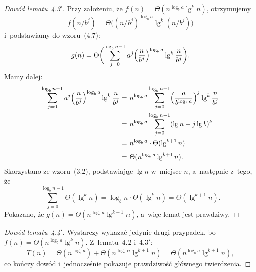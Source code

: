 \begin{proof}[Dowód lematu~4.3\/$'$]
	Przy założeniu, że $f(n)=\Theta(n^{\log_ba}\lg^kn)$, otrzymujemy
	\[
		f(n/b^j)=\Theta\bigl((n/b^j)^{\log_ba}\lg^k(n/b^j)\bigr)
	\]
	i~podstawiamy do wzoru~(4.7):
	\[
		g(n) = \Theta\biggl(\sum_{j=0}^{\log_bn-1}a^j\Bigl(\frac{n}{b^j}\Bigr)^{\log_ba}\lg^k\frac{n}{b^j}\biggr).
	\]
	Mamy dalej:
	\begin{align*}
		\sum_{j=0}^{\log_bn-1}a^j\Bigl(\frac{n}{b^j}\Bigr)^{\log_ba}\lg^k\frac{n}{b^j} &= n^{\log_ba}\sum_{j=0}^{\log_bn-1}\Bigl(\frac{a}{b^{\log_ba}}\Bigr)^j\lg^k\frac{n}{b^j} \\
		&= n^{\log_ba}\sum_{j=0}^{\log_bn-1}(\lg n-j\lg b)^k \\
		&= n^{\log_ba}\cdot\Theta(\lg^{k+1}n) \\[1mm]
		&= \Theta(n^{\log_ba}\lg^{k+1}n).
	\end{align*}
	Skorzystano ze wzoru~(3.2), podstawiając $\lg n$ w~miejsce $n$, a~następnie z~tego, że
	\[
		\sum_{j=0}^{\log_bn-1}\Theta(\lg^kn) = \log_bn\cdot\Theta(\lg^kn) = \Theta(\lg^{k+1}n).
	\]
	Pokazano, że $g(n)=\Theta(n^{\log_ba}\lg^{k+1}n)$, a~więc lemat jest prawdziwy.
\end{proof}

\begin{proof}[Dowód lematu~4.4\/$'$]
	Wystarczy wykazać jedynie drugi przypadek, bo $f(n)=\Theta(n^{\log_ba}\lg^kn)$. Z~lematu~4.2 i~4.3$'$:
	\[
		T(n) = \Theta(n^{\log_ba})+\Theta(n^{\log_ba}\lg^{k+1}n) = \Theta(n^{\log_ba}\lg^{k+1}n),
	\]
	co kończy dowód i~jednocześnie pokazuje prawdziwość głównego twierdzenia.
\end{proof}

\exercise %

